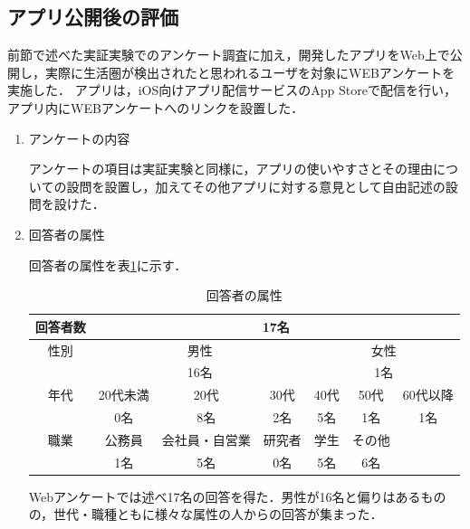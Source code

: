 \documentclass[a4paper]{jsarticle}
\begin{document}
\begin{enumerate}
\subsection{アプリ公開後の評価}
前節で述べた実証実験でのアンケート調査に加え，開発したアプリをWeb上で公開し，実際に生活圏が検出されたと思われるユーザを対象にWEBアンケートを実施した．
アプリは，iOS向けアプリ配信サービスのApp Storeで配信を行い，アプリ内にWEBアンケートへのリンクを設置した．

  \begin{enumerate}
    \item アンケートの内容

    アンケートの項目は実証実験と同様に，アプリの使いやすさとその理由についての設問を設置し，加えてその他アプリに対する意見として自由記述の設問を設けた．

    \item 回答者の属性

    回答者の属性を表\ref{tab:mbn-userstatus}に示す．


    \begin{table}[H]
      \begin{center}
        \caption{回答者の属性}
        \renewcommand\arraystretch{1.4}
        \begin{tabular}{|c|c|c|c|c|c|c|}
          \hline
          \multicolumn{1}{|l|}{回答者数} & \multicolumn{6}{c|}{17名} \\
          \hline
          性別 & \multicolumn{3}{c|}{男性}　& \multicolumn{3}{c|}{女性} \\
          \cline{2-7}
          & \multicolumn{3}{c|}{16名}　& \multicolumn{3}{c|}{1名} \\
          \hline
          年代 & 20代未満 & 20代 & 30代 & 40代 & 50代 & 60代以降 \\
          \cline{2-7}
          & 0名 & 8名 & 2名 & 5名 & 1名 & 1名 \\
          \hline
          職業 & 公務員 & 会社員・自営業 & 研究者 & 学生 & その他 &  \\
          \cline{2-7}
          & 1名 & 5名 & 0名 & 5名 & 6名 & \\
          \hline
        \end{tabular}
        \label{tab:mbn-userstatus}
      \end{center}
    \end{table}

    Webアンケートでは述べ17名の回答を得た．男性が16名と偏りはあるものの，世代・職種ともに様々な属性の人からの回答が集まった．


\end{enumerate}
\end{enumerate}
\end{document}
